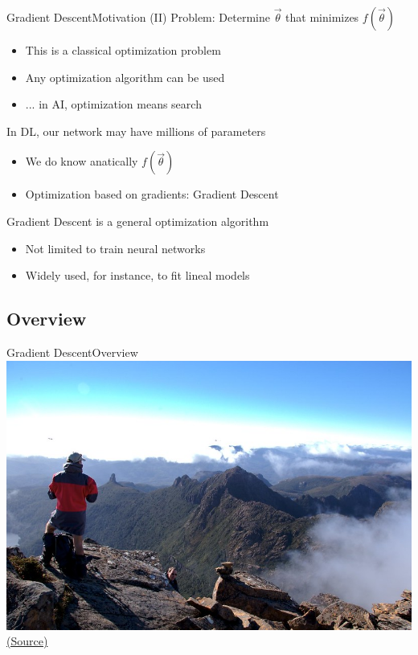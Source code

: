 \documentclass[10pt,compress]{beamer} %
\begin{document}
\begin{frame}{Gradient Descent}{Motivation (II)}
	Problem: Determine $\vec{\theta}$ that minimizes $f(\vec{\theta})$
	\begin{itemize}
		\item This is a classical optimization problem
		\item Any optimization algorithm can be used
		\item ... in AI, optimization means search
	\end{itemize}

	In DL, our network may have millions of parameters
	\begin{itemize}
		\item We do know anatically $f(\vec{\theta})$
		\item Optimization based on gradients: \alert{Gradient Descent}
	\end{itemize}
	Gradient Descent is a general optimization algorithm
	\begin{itemize}
		\item Not limited to train neural networks
		\item Widely used, for instance, to fit lineal models
	\end{itemize}
\end{frame}

\subsection{Overview}

{\blackSlide
\begin{frame}[plain]{Gradient Descent}{Overview}
	\centering\includegraphics[width=\linewidth]{figs/mountain.jpg}\\
	\scriptsize\href{https://flickr.com/photos/pnglife/2362494258/in/photolist-8vGnwi-Mp7XNw-ozKpZv-4ALpeC-axW8KB-23DBJYt-frJNKt-yzPoCX-4LqDab-axf3zv-or4KtC-oqHW4q-axf5yp-23YRq9h-VNJWrs-8McrVM-dNbJXY-5sDfpy-o3SjX-qF1rGP-cfAqTh-YhNXcj-pECdqe-cfAqLE-BRziN1-22w1wBv-6rR9NW-f5iic4-82Vd2C-hzy676-HG1zW6-pT8N-RDfrcf-axf8x8-WKv575-w9JSfr-pT4H-bNwyCT-Cxjb7-bUef42-frJQ4v-Am2QCd-axXouW-axhMph-VqaQum-g78JD3-qtRE5V-egjam3-f9YgJ4-SVGSpe/}{(Source)}
\end{frame}
}
\end{document}
